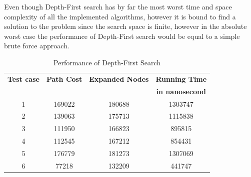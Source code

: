\documentclass[journal]{IEEEtran}
\begin{document}
Even though Depth-First search has by far the most worst time and space complexity of all the implemented algorithms, however it is bound to find a solution to the problem since the search space is finite, however in the absolute worst case the performance of Depth-First search would be equal to a simple brute force approach.  \\

\begin{table}[h]
\renewcommand{\arraystretch}{1.3}
\centering
\caption{Performance of Depth-First Search}
\begin{tabular}{|c|c|c|c|}
\hline
\bfseries Test case &\bfseries Path Cost & \bfseries Expanded Nodes & \bfseries Running Time \\\
 & & &\bfseries in nanosecond\\\hline
1 & 169022 & 180688 & 1303747 \\
2 & 139063 & 175713 & 1115838 \\
3 & 111950 & 166823 & 895815 \\
4 & 112545 & 167212 & 854431 \\
5 & 176779 & 181273 & 1307069 \\
6 & 77218 & 132209 & 441747 \\\hline
\end{tabular}
\label{tab:dfs}
\end{table}
\end{document}
